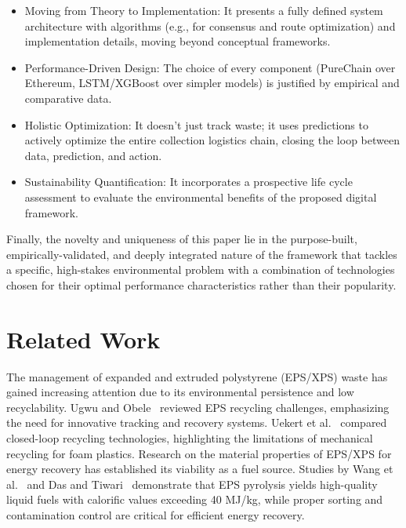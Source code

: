 \documentclass[final,5p,times,twocolumn]{elsarticle}
\begin{document}
\begin{itemize}
    \item Moving from Theory to Implementation: It presents a fully defined system architecture with algorithms (e.g., for consensus and route optimization) and implementation details, moving beyond conceptual frameworks.
    \item Performance-Driven Design: The choice of every component (PureChain over Ethereum, LSTM/XGBoost over simpler models) is justified by empirical and comparative data.
    \item Holistic Optimization: It doesn't just track waste; it uses predictions to actively optimize the entire collection logistics chain, closing the loop between data, prediction, and action.
    \item Sustainability Quantification: It incorporates a prospective life cycle assessment to evaluate the environmental benefits of the proposed digital framework.
\end{itemize}

Finally, the novelty and uniqueness of this paper lie in the purpose-built, empirically-validated, and deeply integrated nature of the framework that tackles a specific, high-stakes environmental problem with a combination of technologies chosen for their optimal performance characteristics rather than their popularity.


\section{Related Work}
The management of expanded and extruded polystyrene (EPS/XPS) waste has gained increasing attention due to its environmental persistence and low recyclability. Ugwu and Obele~\cite{ugwu2023mini} reviewed EPS recycling challenges, emphasizing the need for innovative tracking and recovery systems. Uekert et al.~\cite{uekert2023technical} compared closed-loop recycling technologies, highlighting the limitations of mechanical recycling for foam plastics. Research on the material properties of EPS/XPS for energy recovery has established its viability as a fuel source. Studies by Wang et al.~\cite{WANG2024} and Das and Tiwari~\cite{DAS20} demonstrate that EPS pyrolysis yields high-quality liquid fuels with calorific values exceeding 40 MJ/kg, while proper sorting and contamination control are critical for efficient energy recovery.
\end{document}
